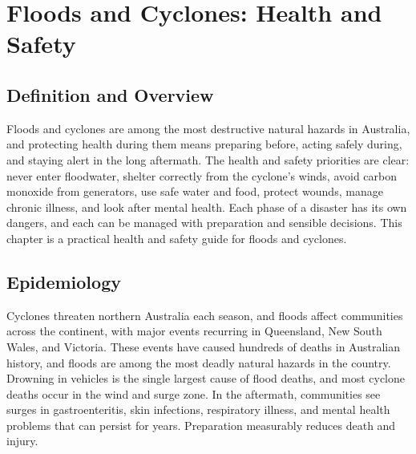 \chapter{Floods and Cyclones: Health and Safety}

\section*{Definition and Overview}
Floods and cyclones are among the most destructive natural hazards in Australia, and protecting health during them means preparing before, acting safely during, and staying alert in the long aftermath. The health and safety priorities are clear: never enter floodwater, shelter correctly from the cyclone's winds, avoid carbon monoxide from generators, use safe water and food, protect wounds, manage chronic illness, and look after mental health. Each phase of a disaster has its own dangers, and each can be managed with preparation and sensible decisions. This chapter is a practical health and safety guide for floods and cyclones.

\section*{Epidemiology}
Cyclones threaten northern Australia each season, and floods affect communities across the continent, with major events recurring in Queensland, New South Wales, and Victoria. These events have caused hundreds of deaths in Australian history, and floods are among the most deadly natural hazards in the country. Drowning in vehicles is the single largest cause of flood deaths, and most cyclone deaths occur in the wind and surge zone. In the aftermath, communities see surges in gastroenteritis, skin infections, respiratory illness, and mental health problems that can persist for years. Preparation measurably reduces death and injury.

